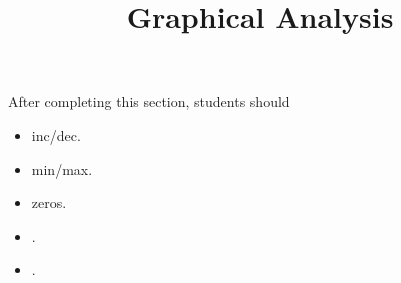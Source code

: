 \documentclass{ximera}
\title{Graphical Analysis}
\begin{document}
\begin{abstract}
\end{abstract}
\maketitle

\begin{sectionOutcomes}
After completing this section, students should 

\begin{itemize}
\item inc/dec.
\item min/max.
\item zeros.
\item .
\item .
\end{itemize}
\end{sectionOutcomes}
\end{document}
